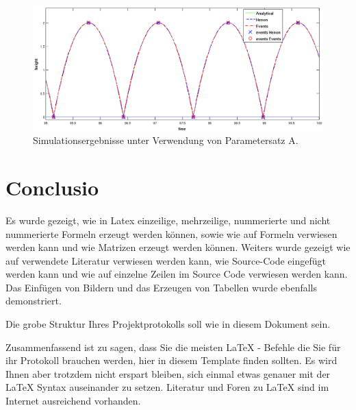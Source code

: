 \documentclass[a4paper,11pt]{scrartcl}
\begin{document}
\begin{figure}[!ht]
 \centering
 \includegraphics[width=\textwidth]{./Bilder/bBheightode23last5Sec.png}
 \caption{Simulationsergebnisse unter Verwendung von Parametersatz A.}
 \label{fig:Bild2}
\end{figure}

\section{Conclusio}
Es wurde gezeigt, wie in Latex einzeilige, mehrzeilige, nummerierte und nicht nummerierte
Formeln erzeugt werden können, sowie wie auf Formeln verwiesen werden kann und wie Matrizen
erzeugt werden können. Weiters wurde gezeigt wie auf verwendete Literatur verwiesen werden kann,
wie Source-Code eingefügt werden kann und wie auf einzelne Zeilen im Source Code verwiesen werden kann.
Das Einfügen von Bildern und das Erzeugen von Tabellen wurde ebenfalls demonstriert.

Die grobe Struktur Ihres Projektprotokolls soll wie in diesem Dokument sein.

Zusammenfassend ist zu sagen, dass Sie die meisten \LaTeX{} - Befehle die Sie für ihr Protokoll
brauchen werden, hier in diesem Template finden sollten. Es wird Ihnen aber trotzdem nicht erspart
bleiben, sich einmal etwas genauer mit der \LaTeX{} Syntax auseinander zu setzen. Literatur und Foren
zu \LaTeX{}  sind im Internet ausreichend vorhanden.

\newpage



\end{document}
